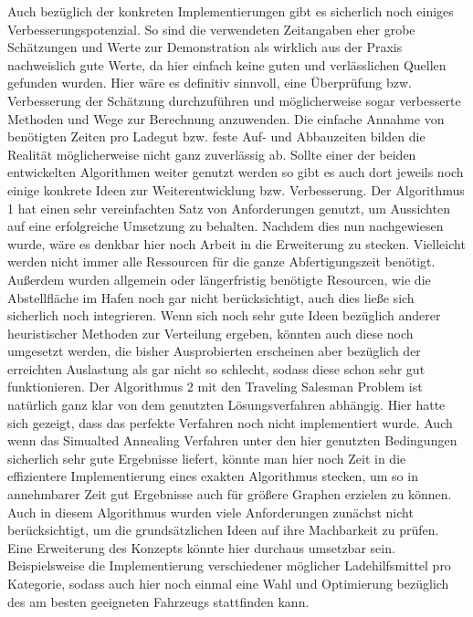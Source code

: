 Auch bezüglich der konkreten Implementierungen gibt es sicherlich noch einiges Verbesserungspotenzial. So sind die verwendeten Zeitangaben eher grobe Schätzungen und Werte zur Demonstration als wirklich aus der Praxis nachweislich gute Werte, da hier einfach keine guten und verlässlichen Quellen gefunden wurden. Hier wäre es definitiv sinnvoll, eine Überprüfung bzw. Verbesserung der Schätzung durchzuführen und möglicherweise sogar verbesserte Methoden und Wege zur Berechnung anzuwenden. Die einfache Annahme von benötigten Zeiten pro Ladegut bzw. feste Auf- und Abbauzeiten bilden die Realität möglicherweise nicht ganz zuverlässig ab. Sollte einer der beiden entwickelten Algorithmen weiter genutzt werden so gibt es auch dort jeweils noch einige konkrete Ideen zur Weiterentwicklung bzw. Verbesserung. 
Der Algorithmus 1 hat einen sehr vereinfachten Satz von Anforderungen genutzt, um Aussichten auf eine erfolgreiche Umsetzung zu behalten. Nachdem dies nun nachgewiesen wurde, wäre es denkbar hier noch Arbeit in die Erweiterung zu stecken. Vielleicht werden nicht immer alle Ressourcen für die ganze Abfertigungszeit benötigt. Außerdem wurden allgemein oder längerfristig benötigte Resourcen, wie die Abstellfläche im Hafen noch gar nicht berücksichtigt, auch dies ließe sich sicherlich noch integrieren. Wenn sich noch sehr gute Ideen bezüglich anderer heuristischer Methoden zur Verteilung ergeben, könnten auch diese noch umgesetzt werden, die bisher Ausprobierten erscheinen aber bezüglich der erreichten Auslastung als gar nicht so schlecht, sodass diese schon sehr gut funktionieren. 
Der Algorithmus 2 mit den Traveling Salesman Problem ist natürlich ganz klar von dem genutzten Lösungsverfahren abhängig. Hier hatte sich gezeigt, dass das perfekte Verfahren noch nicht implementiert wurde. Auch wenn das Simualted Annealing Verfahren unter den hier genutzten Bedingungen sicherlich sehr gute Ergebnisse liefert, könnte man hier noch Zeit in die effizientere Implementierung eines exakten Algorithmus stecken, um so in annehmbarer Zeit gut Ergebnisse auch für größere Graphen erzielen zu können. Auch in diesem Algorithmus wurden viele Anforderungen zunächst nicht berücksichtigt, um die grundsätzlichen Ideen auf ihre Machbarkeit zu prüfen. Eine Erweiterung des Konzepts könnte hier durchaus umsetzbar sein. Beispielsweise die Implementierung verschiedener möglicher Ladehilfsmittel pro Kategorie, sodass auch hier noch einmal eine Wahl und Optimierung bezüglich des am besten geeigneten Fahrzeugs stattfinden kann. 
